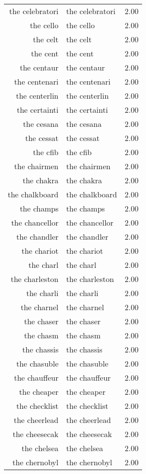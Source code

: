 \begin{table}[ht]
\begin{tabular}{rlr}
  the celebratori & the celebratori & 2.00 \\ 
  the cello & the cello & 2.00 \\ 
  the celt & the celt & 2.00 \\ 
  the cent & the cent & 2.00 \\ 
  the centaur & the centaur & 2.00 \\ 
  the centenari & the centenari & 2.00 \\ 
  the centerlin & the centerlin & 2.00 \\ 
  the certainti & the certainti & 2.00 \\ 
  the cesana & the cesana & 2.00 \\ 
  the cessat & the cessat & 2.00 \\ 
  the cfib & the cfib & 2.00 \\ 
  the chairmen & the chairmen & 2.00 \\ 
  the chakra & the chakra & 2.00 \\ 
  the chalkboard & the chalkboard & 2.00 \\ 
  the champs & the champs & 2.00 \\ 
  the chancellor & the chancellor & 2.00 \\ 
  the chandler & the chandler & 2.00 \\ 
  the chariot & the chariot & 2.00 \\ 
  the charl & the charl & 2.00 \\ 
  the charleston & the charleston & 2.00 \\ 
  the charli & the charli & 2.00 \\ 
  the charnel & the charnel & 2.00 \\ 
  the chaser & the chaser & 2.00 \\ 
  the chasm & the chasm & 2.00 \\ 
  the chassis & the chassis & 2.00 \\ 
  the chasuble & the chasuble & 2.00 \\ 
  the chauffeur & the chauffeur & 2.00 \\ 
  the cheaper & the cheaper & 2.00 \\ 
  the checklist & the checklist & 2.00 \\ 
  the cheerlead & the cheerlead & 2.00 \\ 
  the cheesecak & the cheesecak & 2.00 \\ 
  the chelsea & the chelsea & 2.00 \\ 
  the chernobyl & the chernobyl & 2.00 \\ 

\end{tabular}
\end{table}
